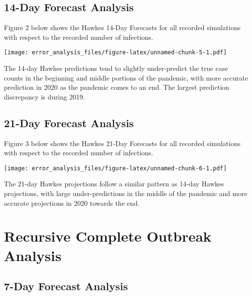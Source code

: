 \documentclass[
]{article}
\begin{document}
\pagebreak

\hypertarget{day-forecast-analysis-1}{%
\subsection{14-Day Forecast Analysis}\label{day-forecast-analysis-1}}

Figure 2 below shows the Hawkes 14-Day Forecasts for all recorded
simulations with respect to the recorded number of infections.\newline

\texttt{[image: error\_analysis\_files/figure-latex/unnamed-chunk-5-1.pdf]}

The 14-day Hawkes predictions tend to slightly under-predict the true
case counts in the beginning and middle portions of the pandemic, with
more accurate prediction in 2020 as the pandemic comes to an end. The
largest prediction discrepancy is during 2019.

\pagebreak

\hypertarget{day-forecast-analysis-2}{%
\subsection{21-Day Forecast Analysis}\label{day-forecast-analysis-2}}

Figure 3 below shows the Hawkes 21-Day Forecasts for all recorded
simulations with respect to the recorded number of infections.\newline

\texttt{[image: error\_analysis\_files/figure-latex/unnamed-chunk-6-1.pdf]}

The 21-day Hawkes projections follow a similar pattern as 14-day Hawkes
projections, with large under-predictions in the middle of the pandemic
and more accurate projections in 2020 towards the end.

\pagebreak

\hypertarget{recursive-complete-outbreak-analysis}{%
\section{Recursive Complete Outbreak
Analysis}\label{recursive-complete-outbreak-analysis}}

\hypertarget{day-forecast-analysis-3}{%
\subsection{7-Day Forecast Analysis}\label{day-forecast-analysis-3}}
\end{document}
